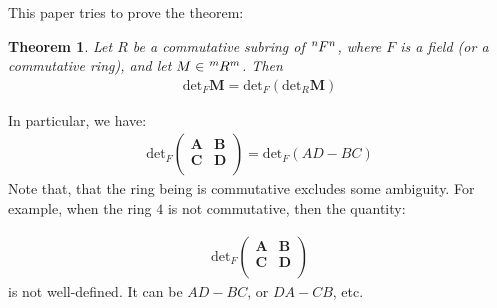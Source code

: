 \documentclass{article}
\numberwithin{equation}{subsection} %
\newtheorem{thm}{Theorem}[section]
\theoremstyle{definition}
\begin{document}
        This paper tries to prove the theorem:

        \begin{thm}
            Let $R$ be a commutative subring of $\tensor[^n]{F}{^n}$,
            where $F$ is a field (or a commutative ring), and let 
            $M\in \tensor[^m]{R}{^m}$. Then 
            \begin{align}
                \text{det}_F \mathbf{M} = 
                    \text{det}_F( \text{det}_R \mathbf{M})
            \end{align}
        \end{thm}
        
        In particular, we have:
        \begin{align}
            \text{det}_F \left(
                \begin{array}{cc}
                \mathbf{A} & \mathbf{B} \\
                \mathbf{C} & \mathbf{D} \\
                \end{array}
                \right)
                = \text{det}_F (AD-BC)
        \end{align}
        Note that, that the ring being is commutative excludes some
        ambiguity. For example, when the ring $4$ is not commutative,
        then the quantity:
        
        \begin{align}
            \text{det}_F \left(
                \begin{array}{cc}
                \mathbf{A} & \mathbf{B} \\
                \mathbf{C} & \mathbf{D} \\
                \end{array}
                \right)
        \end{align}
        is not well-defined. It can be $AD-BC$, or $DA-CB$, etc.
        
\end{document}
